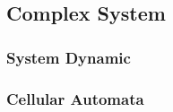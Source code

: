 




\subsection{Complex System} %
\label{sub:complex_system}
\subsubsection{System Dynamic}

\subsubsection{Cellular Automata}
